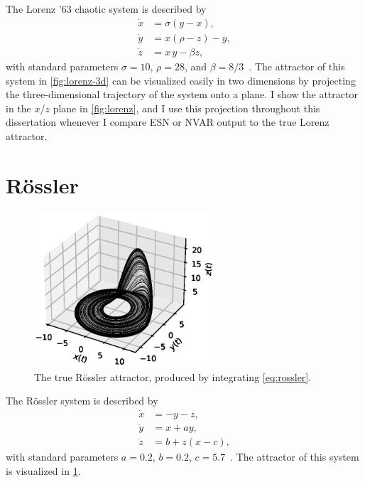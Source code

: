 The Lorenz '63 chaotic system is described by
\begin{equation}
  \begin{aligned}
    \dot{x} &= \sigma \left(y - x\right), \\
    \dot{y} &= x \left(\rho - z\right) - y, \\
    \dot{z} &= x\,y - \beta z,
  \end{aligned}
  \label{eq:lorenz}
\end{equation}
with standard parameters $\sigma = 10$, $\rho = 28$, and $\beta = 8/3$~\cite{lorenz1963}. The attractor of this
system in \cref{fig:lorenz-3d} can be visualized easily in two dimensions by projecting the
three-dimensional trajectory of the system onto a plane. I show the
attractor in the $x$/$z$ plane in \cref{fig:lorenz}, and I use this projection throughout this dissertation whenever I compare ESN or NVAR output to the true Lorenz attractor.

\section{R{\"{o}}ssler}\label{sec:rossler}

\begin{figure}
  \includegraphics[width=0.6\textwidth]{figures/rossler-3d}
  \caption{The true R{\"{o}}ssler attractor, produced by integrating \cref{eq:rossler}.}%
  \label{fig:rossler-3d}
\end{figure}


The R{\"{o}}ssler system is described by
\begin{equation}
  \begin{aligned}
    \dot{x} &= - y - z, \\
    \dot{y} &= x + a y, \\
    \dot{z} &= b + z (x - c),
  \end{aligned}
  \label{eq:rossler}
\end{equation}
with standard parameters $a = 0.2$, $b = 0.2$, $c =
5.7$~\cite{rossler1976}. The attractor of this system is visualized in
\cref{fig:rossler-3d}.

